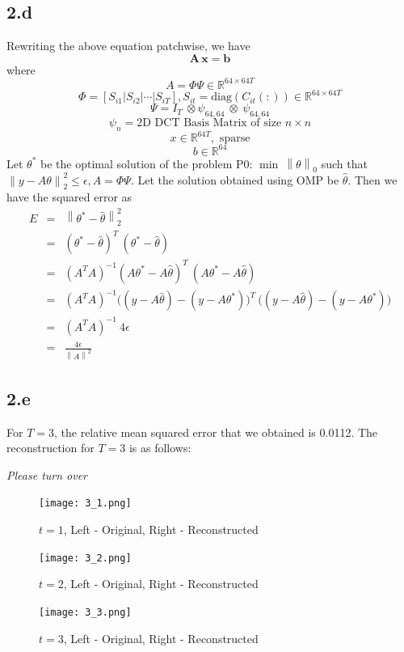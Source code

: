 \documentclass[12pt]{article}
\begin{document}
\subsection*{2.d}
Rewriting the above equation patchwise, we have
$$\mathbf{A\,x = b}$$
where
$$A = \Phi \Psi \in \mathbb{R}^{64\times 64T}$$
$$\Phi = [S_{i1}|S_{i2}|\cdots|S_{iT}], S_{it} = \text{diag}(C_{it}(:)) \in \mathbb{R}^{64 \times 64T}$$
$$\Psi = I_{T} \:\otimes \psi_{64,64} \: \otimes\: \psi_{64,64}$$
$$\psi_n = \text{2D DCT Basis Matrix of size } n \times n$$
$$x \in \mathbb{R}^{64T}, \text{ sparse}$$
$$b \in \mathbb{R}^{64}$$
Let $\theta^*$ be the optimal solution of the problem P0: $\min \: \left\lVert\theta\right\rVert_0$ such that $\left \lVert y - A \theta\right \rVert_2^2 \leq \epsilon, A = \Phi \Psi$.
Let the solution obtained using OMP be $\hat{\theta}$. Then we have the squared error as
\begin{eqnarray*}
E &=& \left \lVert \theta^* - \hat{\theta}\right \rVert^2_2\\
&=& (\theta^* - \hat{\theta})^T\: (\theta^* - \hat{\theta})\\
&=& (A^TA)^{-1} (A\theta^* - A\hat{\theta})^T \: (A\theta^* - A\hat{\theta})\\
&=& (A^TA)^{-1} \bigg((y - A\hat{\theta}) - (y - A\theta^*)\bigg)^T\: \bigg((y - A\hat{\theta}) - (y - A\theta^*)\bigg)\\
&=& (A^TA)^{-1}\: 4\epsilon\\
&=& \frac{4\epsilon}{\left\lVert A \right \rVert^2}
\end{eqnarray*}
\subsection*{2.e}
For $T=3$, the relative mean squared error that we obtained is 0.0112.
The reconstruction for $T=3$ is as follows:
\vspace{2cm}
\begin{center}
	\textit{Please turn over}
\end{center}
\newpage
\begin{figure}[ht]
	\centering
	\texttt{[image: 3\_1.png]}
	\caption{$t = 1$, Left - Original, Right - Reconstructed}
\end{figure}
\begin{figure}[ht]
	\centering
	\texttt{[image: 3\_2.png]}
	\caption{$t = 2$, Left - Original, Right - Reconstructed}
\end{figure}
\begin{figure}[ht]
	\centering
	\texttt{[image: 3\_3.png]}
	\caption{$t = 3$, Left - Original, Right - Reconstructed}
\end{figure}
\end{document}
